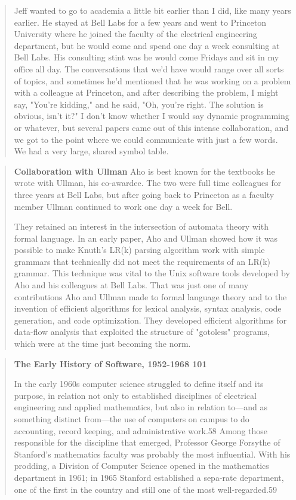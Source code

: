\begin{quotation}
Jeff wanted to go to academia a little bit earlier than I did, like many years 
earlier. He stayed at Bell Labs for a few years and went to Princeton 
University where he joined the faculty of the electrical engineering 
department, but he would come and spend one day a week consulting at Bell Labs. 
His consulting stint was he would come Fridays and sit in my office all day. 
The conversations that we'd have would range over all sorts of topics, and 
sometimes he'd mentioned that he was working on a problem with a colleague at 
Princeton, and after describing the problem, I might say, "You're kidding," and 
he said, "Oh, you're right. The solution is obvious, isn't it?" I don't know 
whether I would say dynamic programming or whatever, but several papers came 
out of this intense collaboration, and we got to the point where we could 
communicate with just a few words. We had a very large, shared symbol table.
\cite{aho_oral_history_2022}
\end{quotation}

\begin{quotation}
\textbf{Collaboration with Ullman}
Aho is best known for the textbooks he wrote with Ullman, his co-awardee. The 
two were full time colleagues for three years at Bell Labs, but after going 
back to Princeton as a faculty member Ullman continued to work one day a week 
for Bell.

They retained an interest in the intersection of automata theory with formal 
language. In an early paper, Aho and Ullman showed how it was possible to make 
Knuth's LR(k) parsing algorithm work with simple grammars that technically did 
not meet the requirements of an LR(k) grammar. This technique was vital to the 
Unix software tools developed by Aho and his colleagues at Bell Labs. That was 
just one of many contributions Aho and Ullman made to formal language theory 
and to the invention of efficient algorithms for lexical analysis, syntax 
analysis, code generation, and code optimization. They developed efficient 
algorithms for data-flow analysis that exploited the structure of "gotoless" 
programs, which were at the time just becoming the norm.
\cite{aho_turing_award_2020}
\end{quotation}

\begin{quotation}
\textbf{The Early History of Software, 1952-1968 101}

In the early 1960s computer science struggled to define itself and its purpose, 
in relation not only to established disciplines of electrical engineering and 
applied mathematics, but also in relation to—and as something distinct from—the 
use of computers on campus to do accounting, record keeping, and administrative 
work.58 Among those responsible for the discipline that emerged, Professor 
George Forsythe of Stanford's mathematics faculty was probably the most 
influential. With his prodding, a Division of Computer Science opened in the 
mathematics department in 1961; in 1965 Stanford established a sepa-rate 
department, one of the first in the country and still one of the most 
well-regarded.59
\cite{history_of_modern_computing_2003_ceruzzi}
\end{quotation}

